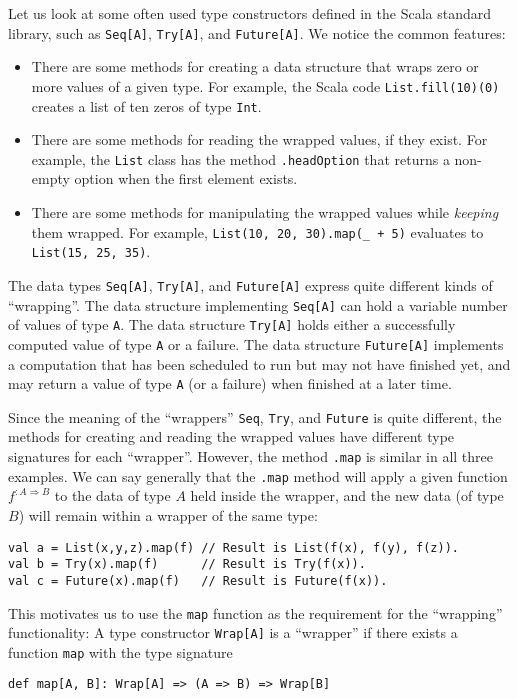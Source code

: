 Let us look at some often used type constructors defined in the Scala
standard library, such as \lstinline!Seq[A]!, \lstinline!Try[A]!,
and \lstinline!Future[A]!. We notice the common features:
\begin{itemize}
\item There are some methods for creating a data structure that wraps zero
or more values of a given type. For example, the Scala code \lstinline!List.fill(10)(0)!
creates a list of ten zeros of type \lstinline!Int!.
\item There are some methods for reading the wrapped values, if they exist.
For example, the \lstinline!List! class has the method \lstinline!.headOption!
that returns a non-empty option when the first element exists.
\item There are some methods for manipulating the wrapped values while \emph{keeping}
them wrapped. For example, \lstinline!List(10, 20, 30).map(_ + 5)!
evaluates to \lstinline!List(15, 25, 35)!.
\end{itemize}
The data types \lstinline!Seq[A]!, \lstinline!Try[A]!, and \lstinline!Future[A]!
express quite different kinds of ``wrapping''. The data structure
implementing \lstinline!Seq[A]! can hold a variable number of values
of type \lstinline!A!. The data structure \lstinline!Try[A]! holds
either a successfully computed value of type \lstinline!A! or a failure.
The data structure \lstinline!Future[A]! implements a computation
that has been scheduled to run but may not have finished yet, and
may return a value of type \lstinline!A! (or a failure) when finished
at a later time.

Since the meaning of the ``wrappers'' \lstinline!Seq!, \lstinline!Try!,
and \lstinline!Future! is quite different, the methods for creating
and reading the wrapped values have different type signatures for
each ``wrapper''. However, the method \lstinline!.map! is similar
in all three examples. We can say generally that the \lstinline!.map!
method will apply a given function $f^{:A\Rightarrow B}$ to the data
of type $A$ held inside the wrapper, and the new data (of type $B$)
will remain within a wrapper of the same type:
\begin{lstlisting}
val a = List(x,y,z).map(f) // Result is List(f(x), f(y), f(z)).
val b = Try(x).map(f)      // Result is Try(f(x)).
val c = Future(x).map(f)   // Result is Future(f(x)).
\end{lstlisting}
This motivates us to use the \lstinline!map! function as the requirement
for the ``wrapping'' functionality: A type constructor \lstinline!Wrap[A]!
is a ``wrapper'' if there exists a function \lstinline!map! with
the  type signature
\begin{lstlisting}
def map[A, B]: Wrap[A] => (A => B) => Wrap[B]
\end{lstlisting}

